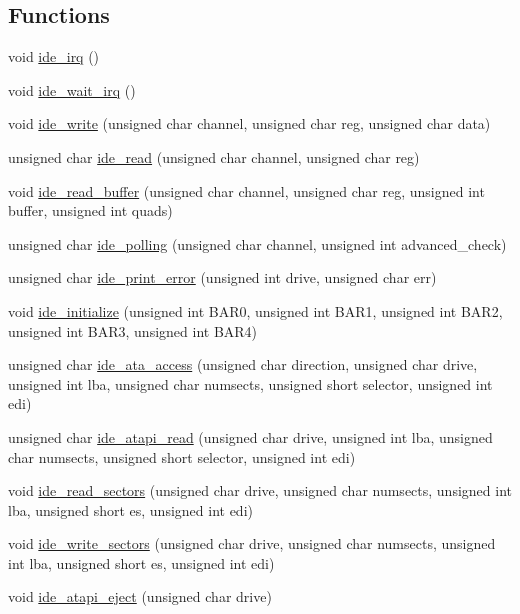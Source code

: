 \subsection*{Functions}
\begin{DoxyCompactItemize}
\item 
void \hyperlink{a00032_ad7ea572af581cc0623a2fb74a579ca83_ad7ea572af581cc0623a2fb74a579ca83}{ide\+\_\+irq} ()
\item 
void \hyperlink{a00032_a31655fcec0cc8f9f8792b98cd4441fdf_a31655fcec0cc8f9f8792b98cd4441fdf}{ide\+\_\+wait\+\_\+irq} ()
\item 
void \hyperlink{a00032_afdb22c37a32d86fcb64e55b3edab4790_afdb22c37a32d86fcb64e55b3edab4790}{ide\+\_\+write} (unsigned char channel, unsigned char reg, unsigned char data)
\item 
unsigned char \hyperlink{a00032_aef734da4bdc0c1d014528fd2f66e0686_aef734da4bdc0c1d014528fd2f66e0686}{ide\+\_\+read} (unsigned char channel, unsigned char reg)
\item 
void \hyperlink{a00032_ac338a611110448d6bd9b8edc491ed19b_ac338a611110448d6bd9b8edc491ed19b}{ide\+\_\+read\+\_\+buffer} (unsigned char channel, unsigned char reg, unsigned int buffer, unsigned int quads)
\item 
unsigned char \hyperlink{a00032_a03e85b94d6fbfb957e1b88c3dd064eca_a03e85b94d6fbfb957e1b88c3dd064eca}{ide\+\_\+polling} (unsigned char channel, unsigned int advanced\+\_\+check)
\item 
unsigned char \hyperlink{a00032_af7757307613c29c9bcbf0f8f5b2feee5_af7757307613c29c9bcbf0f8f5b2feee5}{ide\+\_\+print\+\_\+error} (unsigned int drive, unsigned char err)
\item 
void \hyperlink{a00032_ab5397c8432be802172da8f04c8840ca3_ab5397c8432be802172da8f04c8840ca3}{ide\+\_\+initialize} (unsigned int B\+A\+R0, unsigned int B\+A\+R1, unsigned int B\+A\+R2, unsigned int B\+A\+R3, unsigned int B\+A\+R4)
\item 
unsigned char \hyperlink{a00032_a4da0883393a98b937fdc3015a0a3f265_a4da0883393a98b937fdc3015a0a3f265}{ide\+\_\+ata\+\_\+access} (unsigned char direction, unsigned char drive, unsigned int lba, unsigned char numsects, unsigned short selector, unsigned int edi)
\item 
unsigned char \hyperlink{a00032_a1652da42785708fa6ea21ce4aef8c628_a1652da42785708fa6ea21ce4aef8c628}{ide\+\_\+atapi\+\_\+read} (unsigned char drive, unsigned int lba, unsigned char numsects, unsigned short selector, unsigned int edi)
\item 
void \hyperlink{a00032_a9dd84843412753d236e17a15277c5b98_a9dd84843412753d236e17a15277c5b98}{ide\+\_\+read\+\_\+sectors} (unsigned char drive, unsigned char numsects, unsigned int lba, unsigned short es, unsigned int edi)
\item 
void \hyperlink{a00032_a8632fb3a8cd41b7d60ee56942afbde03_a8632fb3a8cd41b7d60ee56942afbde03}{ide\+\_\+write\+\_\+sectors} (unsigned char drive, unsigned char numsects, unsigned int lba, unsigned short es, unsigned int edi)
\item 
void \hyperlink{a00032_a92d054539c112a72e080e35a3341b0b9_a92d054539c112a72e080e35a3341b0b9}{ide\+\_\+atapi\+\_\+eject} (unsigned char drive)
\end{DoxyCompactItemize}
